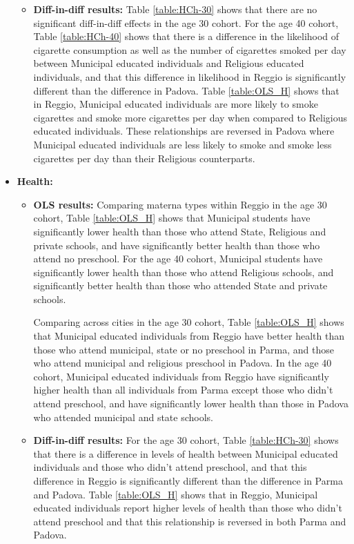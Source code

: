 \documentclass[11pt]{article}
\begin{document}
\begin{itemize}
\begin{itemize}
	\item \textbf{Diff-in-diff results:} Table \ref{table:HCh-30} shows that there are no significant diff-in-diff effects in the age 30 cohort. For the age 40 cohort,  Table \ref{table:HCh-40} shows that there is a difference in the likelihood of cigarette consumption as well as the number of cigarettes smoked per day between Municipal educated individuals and Religious educated individuals, and that this difference in likelihood in Reggio is significantly different than the difference in Padova. Table \ref{table:OLS_H} shows that in Reggio, Municipal educated individuals are more likely to smoke cigarettes and smoke more cigarettes per day when compared to Religious educated individuals. These relationships are reversed in Padova where Municipal educated individuals are less likely to smoke and smoke less cigarettes per day than their Religious counterparts.
	\end{itemize}

\item \textbf{Health:} 
	
	\begin{itemize}
	\item \textbf{OLS results:}  Comparing materna types within Reggio in the age 30 cohort, Table \ref{table:OLS_H} shows that Municipal students have significantly lower health than those who attend State, Religious and private schools, and have significantly better health than those who attend no preschool. For the age 40 cohort, Municipal students have significantly lower health than those who attend Religious schools, and significantly better health than those who attended State and private schools.

	Comparing across cities in the age 30 cohort, Table \ref{table:OLS_H} shows that Municipal educated individuals from Reggio have better health than those who attend municipal, state or no preschool in Parma, and those who attend municipal and religious preschool in Padova. In the age 40 cohort, Municipal educated individuals from Reggio have significantly higher health than all individuals from Parma except those who didn't attend preschool, and have significantly lower health than those in Padova who attended municipal and state schools.

	\item \textbf{Diff-in-diff results:} For the age 30 cohort, Table \ref{table:HCh-30} shows that there is a difference in levels of health between Municipal educated individuals and those who didn't attend preschool, and that this difference in Reggio is significantly different than the difference in Parma and Padova. Table \ref{table:OLS_H} shows that in Reggio, Municipal educated individuals report higher levels of health than those who didn't attend preschool and that this relationship is reversed in both Parma and Padova. 
	

\end{itemize}
\end{itemize}
\end{document}
